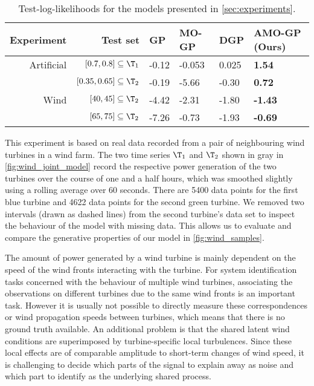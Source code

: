 \documentclass{article}
\begin{document}
\begin{table}[t]
    \centering
    \caption{
        \label{tab:toy_model_log_likelihoods}
        Test-log-likelihoods for the models presented in \cref{sec:experiments}.
    }
    \begin{tabularx}{\linewidth}{rrYYYY}
        \toprule
        Experiment & Test set & GP & MO-GP & DGP & AMO-GP (Ours) \\
        \midrule
        Artificial & $[0.7, 0.8] \subseteq \T_1$ & -0.12 & -0.053 & 0.025 & \textbf{1.54} \\
        & $[0.35, 0.65] \subseteq \T_2$ & -0.19 & -5.66 & -0.30 & \textbf{0.72} \\
        \midrule
        Wind & $[40, 45] \subseteq \T_2 $ & -4.42 & -2.31 & -1.80 & \textbf{-1.43} \\
        & $[65, 75] \subseteq \T_2 $ & -7.26 & -0.73 & -1.93 & \textbf{-0.69} \\
        \bottomrule
    \end{tabularx}
\end{table}
This experiment is based on real data recorded from a pair of neighbouring wind turbines in a wind farm.
The two time series $\T_1$ and $\T_2$ shown in gray in \cref{fig:wind_joint_model} record the respective power generation of the two turbines over the course of one and a half hours, which was smoothed slightly using a rolling average over 60 seconds.
There are 5400 data points for the first blue turbine and 4622 data points for the second green turbine.
We removed two intervals (drawn as dashed lines) from the second turbine's data set to inspect the behaviour of the model with missing data.
This allows us to evaluate and compare the generative properties of our model in \cref{fig:wind_samples}.

The amount of power generated by a wind turbine is mainly dependent on the speed of the wind fronts interacting with the turbine.
For system identification tasks concerned with the behaviour of multiple wind turbines, associating the observations on different turbines due to the same wind fronts is an important task.
However it is usually not possible to directly measure these correspondences or wind propagation speeds between turbines, which means that there is no ground truth available.
An additional problem is that the shared latent wind conditions are superimposed by turbine-specific local turbulences.
Since these local effects are of comparable amplitude to short-term changes of wind speed, it is challenging to decide which parts of the signal to explain away as noise and which part to identify as the underlying shared process.
\end{document}
